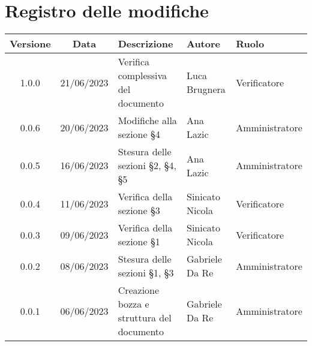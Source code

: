 \section*{Registro delle modifiche}
\begin{center}
\setlength\extrarowheight{5pt}
\renewcommand\tabularxcolumn[1]{>{\Centering}m{#1}}
\begin{tabularx}{\textwidth}{| c | c | X | X | X |} 
	\hline
	\rowcolor{white}
	\textbf{Versione} & \textbf{Data} & \textbf{Descrizione} & \textbf{Autore} & \textbf{Ruolo}\\
	\hline
	1.0.0 & 21/06/2023 & Verifica complessiva del documento & Luca Brugnera & Verificatore\\
	\hline
	0.0.6 & 20/06/2023 & Modifiche alla sezione §4 & Ana Lazic & Amministratore\\
	\hline
	0.0.5 & 16/06/2023 & Stesura delle sezioni §2, §4, §5  & Ana Lazic & Amministratore\\
 \hline
	0.0.4 & 11/06/2023 & Verifica della sezione §3 & Sinicato Nicola & Verificatore\\
 \hline
	0.0.3 & 09/06/2023 & Verifica della sezione §1 & Sinicato Nicola & Verificatore\\
	\hline
	0.0.2 & 08/06/2023 & Stesura delle sezioni §1, §3 & Gabriele Da Re & Amministratore\\
	\hline
	0.0.1 & 06/06/2023 & Creazione bozza e struttura del documento & Gabriele Da Re & Amministratore\\
	\hline
	\end{tabularx}
\end{center}
